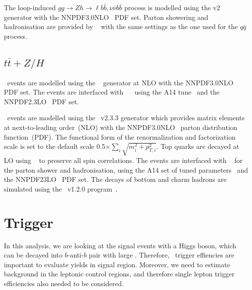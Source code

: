 \par The loop-induced $gg\to Zh \to \ell b\bar{b}, \nu\bar{\nu}b\bar{b}$ process is modelled using the \powhegbox v2 generator \cite{Alioli:2010xd} with the NNPDF3.0NLO~\cite{Ball:2014uwa} PDF set.
Parton showering and hadronisation are provided by \pythia~\cite{Sjostrand:2014zea} with the same settings as the one used for the $q\bar{q}$ process.

\subsection{$t\bar{t}+Z/H$}

\par \ttH~events are modelled using the \powhegbox~\cite{Frixione:2007nw,Nason:2004rx,Frixione:2007vw,Alioli:2010xd,Hartanto:2015uka}
generator at NLO with the NNPDF3.0NLO~\cite{Ball:2014uwa} PDF set.
The events are interfaced with \pythia~\cite{Sjostrand:2014zea}~ using the A14 tune~\cite{ATL-PHYS-PUB-2014-021} and the NNPDF2.3LO~\cite{Ball:2014uwa} PDF set.

\par \ttV~events are modelled using the \mgamc~v2.3.3 \cite{Alwall:2014hca} generator which provides matrix elements at next-to-leading order~(NLO) with the NNPDF3.0NLO~\cite{Ball:2014uwa} parton distribution function~(PDF).
The functional form of the renormalization and factorization scale is set to the default scale 0.5$\times \sum_i \sqrt{m^2_i+p^2_{T,i}}$.
Top quarks are decayed at LO using \madspin~\cite{Frixione:2007zp,Artoisenet:2012st} to preserve all spin correlations.
The events are interfaced with \pythia~\cite{Sjostrand:2014zea} for the parton shower and hadronisation,
using the A14 set of tuned parameters~\cite{ATL-PHYS-PUB-2014-021}  and the NNPDF23LO~\cite{Ball:2014uwa} PDF set.
The decays of bottom and charm hadrons are simulated using the \evtgen\ v1.2.0 program~\cite{EvtGen}.

\section{Trigger}
\label{sec:trigger}

\par In this analysis, we are looking at the signal events with a Higgs boson, which can be decayed into $b$-anti-$b$ pair with large \met. 
Therefore, \met~trigger effiencies are important to evaluate yields in signal region. 
Moreover, we need to estimate background in the leptonic control regions, and therefore single lepton trigger efficiencies also needed to be considered.

